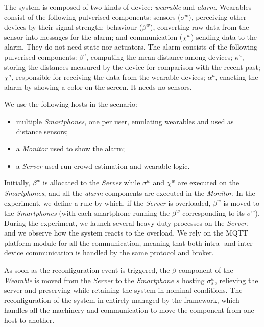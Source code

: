 \documentclass[conference]{IEEEtran}
\newcommand{\meta}[1]{{\color{blue}#1}}
\begin{document}
The system is composed of two kinds of device: \emph{wearable} and \emph{alarm}.
%
Wearables consist of the following pulverised components:
sensors ($\sigma^w$), perceiving other devices by their signal strength;
behaviour ($\beta^w$), converting raw data from the sensor into messages for the alarm; and
communication ($\chi^w$) sending data to the alarm.
%
They do not need state nor actuators.
%
The alarm consists of the following pulverised components:
$\beta^a$, computing the mean distance among devices;
$\kappa^a$, storing the distances measured by the device for comparison with the recent past;
$\chi^a$, responsible for receiving the data from the wearable devices;
$\alpha^a$, enacting the alarm by showing a color on the screen.
%
It needs no sensors.

We use the following hosts in the scenario:
\begin{itemize}
    \item multiple \emph{Smartphones}, one per user, emulating wearables and used as distance sensors;
    \item a \emph{Monitor} used to show the alarm;
    \item a \emph{Server} used run crowd estimation and wearable logic.
\end{itemize}

Initially, $\beta^{w}$ is allocated to the \emph{Server} while
$\sigma^{w}$ and $\chi^{w}$ are executed on the \emph{Smartphones},
and all the \emph{alarm} components are executed in the \emph{Monitor}.
%
In the experiment,
we define a rule by which,
if the \emph{Server} is overloaded,
$\beta^{w}$ is moved to the \emph{Smartphones}
(with each smartphone running the $\beta^{w}$ corresponding to its $\sigma^{w}$).
%
During the experiment,
we launch several heavy-duty processes on the \emph{Server},
and we observe how the system reacts to the overload.
%
We rely on the MQTT platform module for all the communication,
meaning that both intra- and inter-device communication is handled by the same protocol and broker.

As soon as the reconfiguration event is triggered,
the $\beta$ component of the \emph{Wearable} is moved from the \emph{Server} to the \emph{Smartphone} $s$ hosting $\sigma^{w}_{s}$,
relieving the server and preserving while retaining the system in nominal conditions.
%
The reconfiguration of the system in entirely managed by the framework,
which handles all the machinery and communication to move the component from
one host to another.
\end{document}
